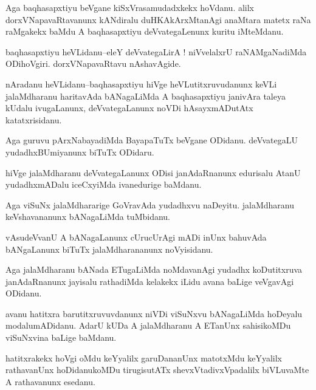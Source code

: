\documentclass{article}
\begin{document}
\begin{mn}%
Aga baqhasapxtiyu beVgane kiSxVrasamudadxkekx hoVdanu. alilx dorxVNapavaRtavanunx kANdiralu 
duHKAkArxMtanAgi anaMtara matetx raNa raMgakekx baMdu A baqhasapxtiyu deVvategaLenunx 
kuritu iMteMdanu.
\end{mn}

\begin{mn}%
baqhasapxtiyu heVLidanu--eleY deVvategaLirA ! niVvelalxrU raNAMgaNadiMda ODihoVgiri. 
dorxVNapavaRtavu nAshavAgide.
\end{mn}

\begin{mn}%
nAradanu heVLidanu--baqhasapxtiyu hiVge heVLutitxruvudanunx keVLi jalaMdharanu haritavAda 
bANagaLiMda A baqhasapxtiyu janivAra taleya kUdalu ivugaLanunx, deVvategaLanunx noVDi 
hAsayxmADutAtx katatxrisidanu.
\end{mn}

\begin{mn}%
Aga guruvu pArxNabayadiMda BayapaTuTx beVgane ODidanu. deVvategaLU yudadhxBUmiyanunx biTuTx 
ODidaru.
\end{mn}

\begin{mn}%
hiVge jalaMdharanu deVvategaLanunx ODisi janAdaRnanunx edurisalu AtanU yudadhxmADalu 
iceCxyiMda ivanedurige baMdanu.
\end{mn}

\begin{mn}%
Aga viSuNx jalaMdhararige GoVravAda yudadhxvu naDeyitu. jalaMdharanu keVshavananunx 
bANagaLiMda tuMbidanu.
\end{mn}

\begin{mn}%
vAsudeVvanU A bANagaLanunx cUrucUrAgi mADi inUnx bahuvAda bANgaLanunx biTuTx 
jalaMdharananunx noVyisidanu.
\end{mn}

\begin{mn}%
Aga jalaMdharanu bANada ETugaLiMda noMdavanAgi yudadhx koDutitxruva janAdaRnanunx jayisalu 
rathadiMda kelakekx iLidu avana baLige veVgavAgi ODidanu.
\end{mn}

\begin{mn}%
avanu hatitxra barutitxruvuvdanunx niVDi viSuNxvu bANagaLiMda hoDeyalu modalumADidanu. AdarU 
kUDa A jalaMdharanu A ETanUnx sahisikoMDu viSuNxvina baLige baMdanu.
\end{mn}

\begin{mn}%
hatitxrakekx hoVgi oMdu keYyalilx garuDananUnx matotxMdu keYyalilx rathavanUnx hoDidanukoMDu 
tirugisutATx shevxVtadivxVpadalilx biVLuvaMte A rathavanunx esedanu.
\end{mn}
\end{document}
